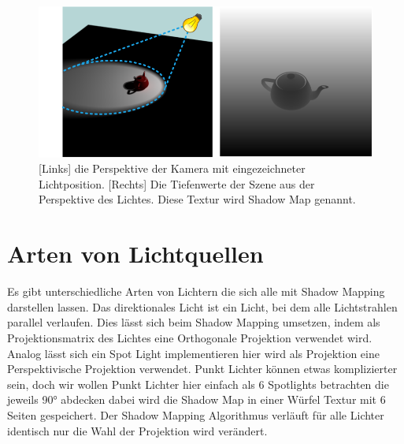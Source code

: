 \begin{figure}
	\begin{center}
		\includegraphics[width=1\textwidth]{res/img/shadow-mapping/shadow_map_principle.png}
    \caption{[Links] die Perspektive der Kamera mit eingezeichneter Lichtposition. 
    [Rechts] Die Tiefenwerte der Szene aus der Perspektive des Lichtes. 
    Diese Textur wird Shadow Map genannt.}
	\end{center}
	\label{fig:shadow-map}
\end{figure}
\section{Arten von Lichtquellen}
\label{section:types-of-sources}
Es gibt unterschiedliche Arten von Lichtern die sich alle mit Shadow Mapping darstellen lassen.
Das direktionales Licht ist ein Licht, bei dem alle Lichtstrahlen parallel verlaufen.
Dies lässt sich beim Shadow Mapping umsetzen, indem als Projektionsmatrix des Lichtes eine
Orthogonale Projektion verwendet wird.
Analog lässt sich ein Spot Light implementieren hier wird als Projektion eine Perspektivische Projektion verwendet.
Punkt Lichter können etwas komplizierter sein, doch wir wollen Punkt Lichter hier einfach als 6 Spotlights betrachten
die jeweils 90° abdecken dabei wird die Shadow Map in einer Würfel Textur mit 6 Seiten gespeichert.
Der Shadow Mapping Algorithmus verläuft für alle Lichter identisch nur die Wahl der Projektion wird verändert.

